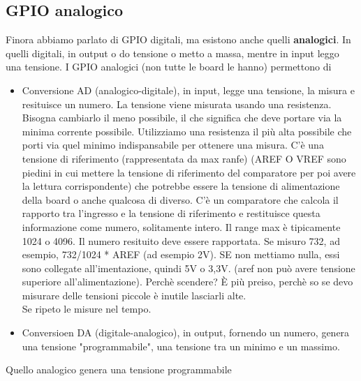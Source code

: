 \documentclass{article}
\begin{document}
\subsection{GPIO analogico}
Finora abbiamo parlato di GPIO digitali, ma esistono anche quelli \textbf{analogici}. In quelli digitali, in output o do tensione o metto a massa, mentre in input leggo una tensione. I GPIO analogici (non tutte le board le hanno) permettono di
\begin{itemize}
    \item Conversione AD (analogico-digitale), in input, legge una tensione, la misura e resituisce un numero. La tensione viene misurata usando una resistenza. Bisogna cambiarlo il meno possibile, il che significa che deve portare via la minima corrente possibile. Utilizziamo una resistenza il più alta possibile che porti via quel minimo indispansabile per ottenere una misura.
          C'è una tensione di riferimento (rappresentata da max ranfe) (AREF O VREF sono piedini in cui mettere la tensione di riferimento del comparatore per poi avere la lettura corrispondente) che potrebbe essere la tensione di alimentazione della board o anche qualcosa di diverso. C'è un comparatore che calcola il rapporto tra l'ingresso e la tensione di riferimento e restituisce questa informazione come numero, solitamente intero. Il range max è tipicamente 1024 o 4096. Il numero resituito deve essere
          rapportata. Se misuro 732, ad esempio, 732/1024 * AREF (ad esempio 2V). SE non mettiamo nulla, essi sono collegate all'imentazione, quindi 5V o 3,3V. (aref non può avere tensione superiore all'alimentazione). Perchè scendere? È più preiso, perchè so se devo misurare delle tensioni piccole è inutile lasciarli alte.
          \\ Se ripeto le misure nel tempo.
    \item Conversioen DA (digitale-analogico), in output, fornendo un numero, genera una tensione "programmabile", una tensione tra un minimo e un massimo.
\end{itemize}
Quello analogico genera una tensione programmabile
\end{document}
